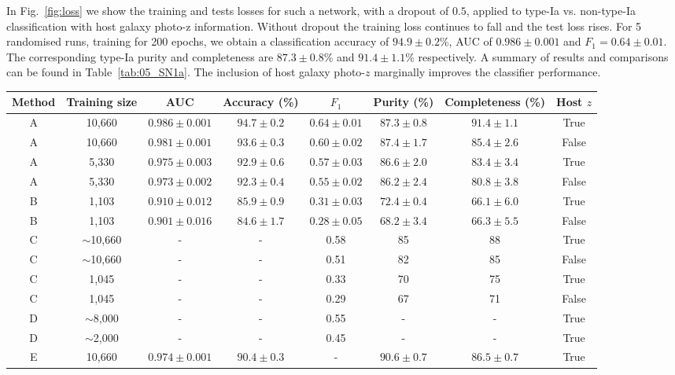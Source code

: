\documentclass[twocolumn]{aastex61}
\begin{document}
In Fig.~\ref{fig:loss} we show the training and tests losses for such a network, with a dropout of $0.5$, applied to type-Ia vs. non-type-Ia classification with host galaxy photo-z information. Without dropout the training loss continues to fall and the test loss rises. For 5 randomised runs, training for 200 epochs, we obtain a classification accuracy of $94.9 \pm 0.2$\%, AUC of $0.986 \pm 0.001$ and $F_1 = 0.64 \pm 0.01$. The corresponding type-Ia purity and completeness are $87.3 \pm 0.8\%$ and $91.4\pm 1.1\%$ respectively. A summary of results and comparisons can be found in Table~\ref{tab:05_SN1a}. The inclusion of host galaxy photo-$z$ marginally improves the classifier performance.  

\begin{table}[t!]
\centering
\begin{tabular}{ c  c  c  c  c  c  c  c }\hline\hline
Method & Training size & AUC & Accuracy (\%) & $F_1$ & Purity (\%) & Completeness (\%) & Host $z$ \\\hline\hline
A & 10,660 & $0.986 \pm 0.001$ & $94.7 \pm 0.2$ & $0.64 \pm 0.01$ & $87.3 \pm 0.8$ & $91.4 \pm 1.1$ & True \\
A & 10,660 & $0.981 \pm 0.001$ & $93.6 \pm 0.3$ & $0.60 \pm 0.02$ & $87.4 \pm 1.7$ & $85.4 \pm 2.6$ & False \\
A & 5,330 & $0.975 \pm 0.003$ & $92.9 \pm 0.6$ & $0.57 \pm 0.03$ & $86.6\pm 2.0$ & $83.4 \pm 3.4$ & True \\
A & 5,330 & $0.973 \pm 0.002$ & $92.3 \pm 0.4$ & $0.55 \pm 0.02$ & $86.2 \pm 2.4$ & $80.8 \pm 3.8$ & False \\
B & 1,103 & $0.910 \pm 0.012$ & $85.9 \pm 0.9$ & $0.31 \pm 0.03$ & $72.4 \pm 0.4$ & $66.1 \pm 6.0$ & True \\
B & 1,103 & $0.901 \pm 0.016$ & $84.6 \pm 1.7$ & $0.28 \pm 0.05$ & $68.2 \pm 3.4$ & $66.3 \pm 5.5$ & False \\
C & $\sim$10,660 & - & - & 0.58 & 85 & 88 & True \\
C & $\sim$10,660 & - & - & 0.51 & 82 & 85 & False \\
C & 1,045 & - & - & 0.33 & 70 & 75 & True \\
C & 1,045 & - & - & 0.29 & 67 & 71 & False \\
D & $\sim$8,000 & - & - & 0.55 & - & - & True \\
D & $\sim$2,00$\underset{~}{0}$ & - & - & 0.45 & - & - & True \\
\hline\hline
E & 10,660 & $0.974 \pm 0.001$ & $90.4 \pm 0.3$ & - & $90.6 \pm 0.7$ & $86.5 \pm 0.7$ & True\\

\end{tabular}
\end{table}
\end{document}
